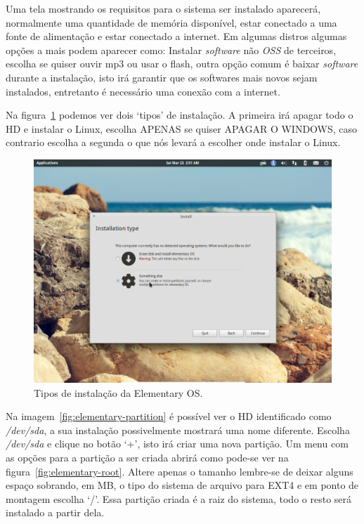 \documentclass{handout_utfpr}
\begin{document}
Uma tela mostrando os requisitos para o sistema ser instalado aparecerá, normalmente uma quantidade de memória disponível, estar conectado a uma fonte de alimentação e estar conectado a internet. Em algumas distros algumas opções a mais podem aparecer como: Instalar \emph{software} não \emph{OSS} de terceiros, escolha se quiser ouvir mp3 ou usar o flash, outra opção comum é baixar \emph{software} durante a instalação, isto irá garantir que os softwares mais novos sejam instalados, entretanto é necessário uma conexão com a internet.

Na figura~\ref{fig:elementary-install} podemos ver dois `tipos' de instalação. A primeira irá apagar todo o HD e instalar o Linux, escolha APENAS se quiser APAGAR O WINDOWS, caso contrario escolha a segunda o que nós levará a escolher onde instalar o Linux.

\begin{figure}[H]
  \centering
  \includegraphics[scale=.3]{imagens/elementary-install-03.png}
  \caption{Tipos de instalação da Elementary OS\@.}
  \label{fig:elementary-install}
\end{figure}


Na imagem~\ref{fig:elementary-partition} é possível ver o HD identificado como \emph{/dev/sda}, a sua instalação possivelmente mostrará uma nome diferente. Escolha \emph{/dev/sda} e clique no botão `+', isto irá criar uma nova partição. Um menu com as opções para a partição a ser criada abrirá como pode-se ver na figura~\ref{fig:elementary-root}. Altere apenas o tamanho lembre-se de deixar alguns espaço sobrando, em MB, o tipo do sistema de arquivo para EXT4 e em ponto de montagem escolha `/'. Essa partição criada é a raiz do sistema, todo o resto será instalado a partir dela.
\end{document}
